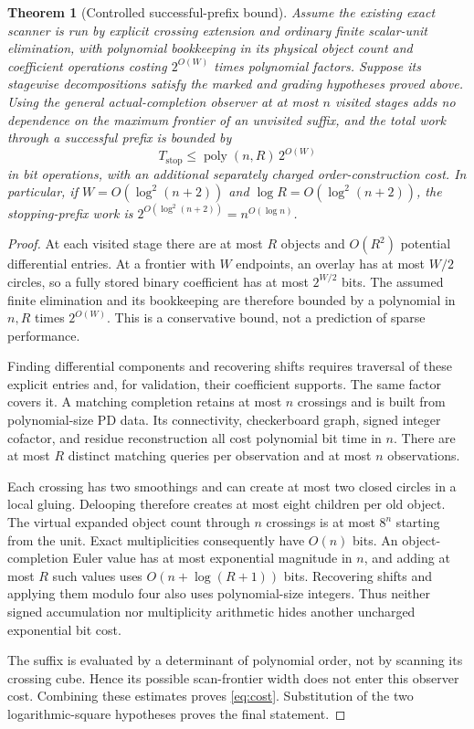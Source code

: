\documentclass[11pt]{article}
\newtheorem{theorem}{Theorem}[section]
\theoremstyle{definition}
\theoremstyle{remark}
\newcommand{\poly}{\operatorname{poly}}
\begin{document}
\begin{theorem}[Controlled successful-prefix bound]\label{thm:complexity}
Assume the existing exact scanner is run by explicit crossing extension and
ordinary finite scalar-unit elimination, with polynomial bookkeeping in its
physical object count and coefficient operations costing $2^{O(W)}$ times
polynomial factors. Suppose its stagewise decompositions satisfy the marked
and grading hypotheses proved above. Using the general actual-completion
observer at at most $n$ visited stages adds no dependence on the maximum
frontier of an unvisited suffix, and the total work through a successful
prefix is bounded by
\begin{equation}\label{eq:cost}
 T_{\mathrm{stop}}\le \poly(n,R)\,2^{O(W)}
\end{equation}
in bit operations, with an additional separately charged order-construction
cost. In particular, if $W=O(\log^2(n+2))$ and
$\log R=O(\log^2(n+2))$, the stopping-prefix work is
$2^{O(\log^2(n+2))}=n^{O(\log n)}$.
\end{theorem}
\begin{proof}
At each visited stage there are at most $R$ objects and $O(R^2)$ potential
differential entries. At a frontier with $W$ endpoints, an overlay has at
most $W/2$ circles, so a fully stored binary coefficient has at most
$2^{W/2}$ bits. The assumed finite elimination and its bookkeeping are
therefore bounded by a polynomial in $n,R$ times $2^{O(W)}$. This is a
conservative bound, not a prediction of sparse performance.

Finding differential components and recovering shifts requires traversal of
these explicit entries and, for validation, their coefficient supports.
The same factor covers it. A matching completion retains at most $n$
crossings and is built from polynomial-size PD data. Its connectivity,
checkerboard graph, signed integer cofactor, and residue reconstruction all
cost polynomial bit time in $n$. There are at most $R$ distinct matching
queries per observation and at most $n$ observations.

Each crossing has two smoothings and can create at most two closed circles
in a local gluing. Delooping therefore creates at most eight children per
old object. The virtual expanded object count through $n$ crossings is at
most $8^n$ starting from the unit. Exact multiplicities consequently have
$O(n)$ bits. An object-completion Euler value has at most exponential
magnitude in $n$, and adding at most $R$ such values uses
$O(n+\log(R+1))$ bits. Recovering shifts and applying them modulo four also
uses polynomial-size integers. Thus neither signed accumulation nor
multiplicity arithmetic hides another uncharged exponential bit cost.

The suffix is evaluated by a determinant of polynomial order, not by
scanning its crossing cube. Hence its possible scan-frontier width does
not enter this observer cost. Combining these estimates proves
\eqref{eq:cost}. Substitution of the two logarithmic-square hypotheses
proves the final statement.
\end{proof}
\end{document}

